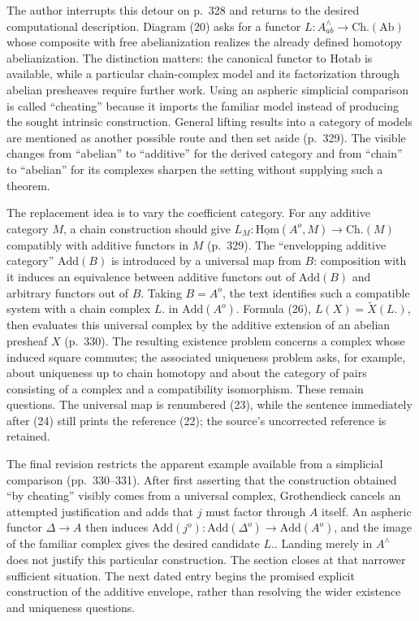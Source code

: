 The author interrupts this detour on p.~328 and returns to the desired computational description. Diagram (20) asks for a functor $L:A^{\wedge}_{ab}\to\mathrm{Ch.}(\mathrm{Ab})$ whose composite with free abelianization realizes the already defined homotopy abelianization. The distinction matters: the canonical functor to $\mathrm{Hotab}$ is available, while a particular chain-complex model and its factorization through abelian presheaves require further work. Using an aspheric simplicial comparison is called ``cheating'' because it imports the familiar model instead of producing the sought intrinsic construction. General lifting results into a category of models are mentioned as another possible route and then set aside (p.~329). The visible changes from ``abelian'' to ``additive'' for the derived category and from ``chain'' to ``abelian'' for its complexes sharpen the setting without supplying such a theorem.

The replacement idea is to vary the coefficient category. For any additive category $M$, a chain construction should give $L_M:\underline{\mathrm{Hom}}(A^o,M)\to\mathrm{Ch.}(M)$ compatibly with additive functors in $M$ (p.~329). The ``envelopping additive category'' $\mathrm{Add}(B)$ is introduced by a universal map from $B$: composition with it induces an equivalence between additive functors out of $\mathrm{Add}(B)$ and arbitrary functors out of $B$. Taking $B=A^o$, the text identifies such a compatible system with a chain complex $L.$ in $\mathrm{Add}(A^o)$. Formula (26), $L(X)=\widetilde X(L.)$, then evaluates this universal complex by the additive extension of an abelian presheaf $X$ (p.~330). The resulting existence problem concerns a complex whose induced square commutes; the associated uniqueness problem asks, for example, about uniqueness up to chain homotopy and about the category of pairs consisting of a complex and a compatibility isomorphism. These remain questions. The universal map is renumbered (23), while the sentence immediately after (24) still prints the reference (22); the source's uncorrected reference is retained.

The final revision restricts the apparent example available from a simplicial comparison (pp.~330--331). After first asserting that the construction obtained ``by cheating'' visibly comes from a universal complex, Grothendieck cancels an attempted justification and adds that $j$ must factor through $A$ itself. An aspheric functor $\Delta\to A$ then induces $\mathrm{Add}(j^o):\mathrm{Add}(\Delta^o)\to\mathrm{Add}(A^o)$, and the image of the familiar complex gives the desired candidate $L.$. Landing merely in $A^{\wedge}$ does not justify this particular construction. The section closes at that narrower sufficient situation. The next dated entry begins the promised explicit construction of the additive envelope, rather than resolving the wider existence and uniqueness questions.

